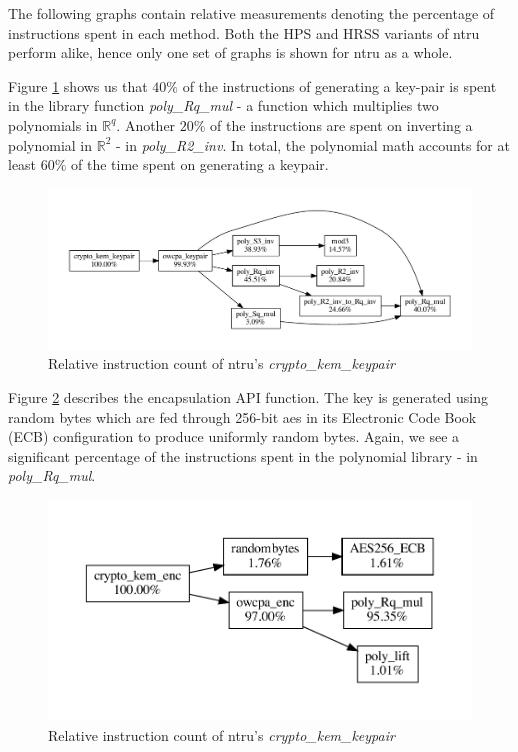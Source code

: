 The following graphs contain relative measurements denoting the percentage of instructions spent in each method. Both the HPS and HRSS variants of \gls{ntru} perform alike, hence only one set of graphs is shown for \gls{ntru} as a whole.

Figure \ref{figure:result:hot-paths:ntru:crypto_kem_keypair} shows us that $40\%$ of the instructions of generating a key-pair is spent in the library function \textit{poly\_Rq\_mul} - a function which multiplies two polynomials in $\mathbb{R}^q$. Another $20\%$ of the instructions are spent on inverting a polynomial in $\mathbb{R}^2$ - in \textit{poly\_R2\_inv}. In total, the polynomial math accounts for at least $60\%$ of the time spent on generating a keypair.

\begin{figure}[H]
    \centering
    \includegraphics[scale=0.5]{chapters/results/hot-paths/ntru/crypto_kem_keypair.pdf}
    \caption{Relative instruction count of \gls{ntru}'s \textit{crypto\_kem\_keypair}}
    \label{figure:result:hot-paths:ntru:crypto_kem_keypair}
\end{figure}

Figure \ref{figure:result:hot-paths:ntru:crypto_kem_enc} describes the encapsulation API function. The key is generated using random bytes which are fed through 256-bit \gls{aes} in its Electronic Code Book (ECB) configuration to produce uniformly random bytes. Again, we see a significant percentage of the instructions spent in the polynomial library - in \textit{poly\_Rq\_mul}.

\begin{figure}[H]
    \centering
    \includegraphics[scale=0.5]{chapters/results/hot-paths/ntru/crypto_kem_enc.pdf}
    \caption{Relative instruction count of \gls{ntru}'s \textit{crypto\_kem\_keypair}}
    \label{figure:result:hot-paths:ntru:crypto_kem_enc}
\end{figure}

